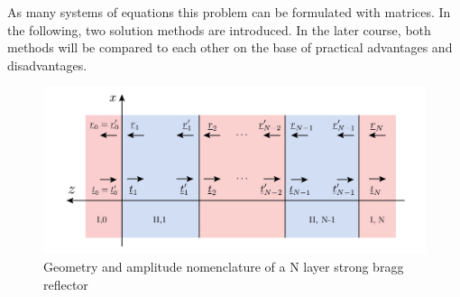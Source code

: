 As many systems of equations this problem can be formulated with matrices. In
the following, two solution methods are introduced. In the later course, both
methods will be compared to each other on the base of practical advantages and
disadvantages.

\begin{figure}[h]
    \centering
    \includegraphics[width=\textwidth]{pictures/DBR_amplitudes_final.jpg}
    \caption{Geometry and amplitude nomenclature of a N layer strong bragg
        reflector}
    \label{fig:dbr}
\end{figure}

